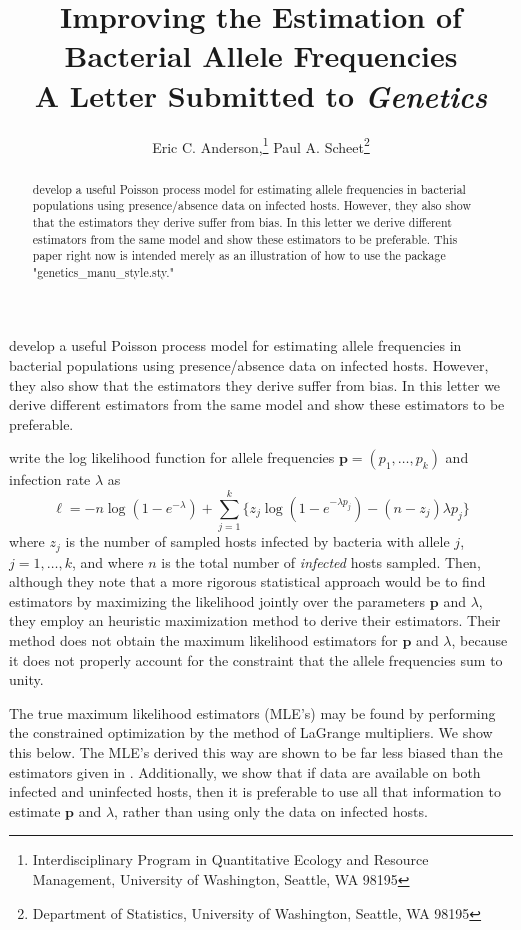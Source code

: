 \documentclass[12pt,titlepage]{article}
\title{Improving the Estimation of Bacterial Allele Frequencies  \\
\protect\small A Letter Submitted to {\em Genetics}}
\author{Eric C. Anderson,\thanks{Interdisciplinary Program in Quantitative
Ecology and Resource Management, University of Washington,
Seattle, WA 98195} Paul A. Scheet\thanks{Department of Statistics, University of
Washington, Seattle, WA 98195}}
\newcommand{\bp}{\mathbf{p}}
\begin{document}
\maketitle



\begin{abstract}
 develop a useful Poisson process
model for estimating allele frequencies in bacterial populations using
presence/absence data on infected hosts.  However, they also show that the
estimators they derive suffer from bias.  In this letter we derive
different estimators from the same model and show these estimators to
be preferable.  This paper right now is intended merely as an illustration
of how to use the package "genetics\_manu\_style.sty."
\end{abstract}


 develop a useful Poisson process
model for estimating allele frequencies in bacterial populations using
presence/absence data on infected hosts.  However, they also show that the
estimators they derive suffer from bias.  In this letter we derive
different estimators from the same model and show these estimators to
be preferable.

   write the log likelihood function for allele
frequencies 
$\bp=(p_1,\ldots,p_k)$ and infection rate
$\lambda$ as 
\begin{equation}
\ell = -n \log(1-e^{-\lambda}) + \sum_{j=1}^k
\{z_j \log(1-e^{-\lambda p_j}) - (n-z_j)\lambda p_j\}
\label{eq:loglike}
\end{equation}
where $z_j$ is the number of sampled hosts infected by
bacteria with allele $j$, $j=1,\ldots,k$, and where $n$ is the total
number of {\em infected} hosts sampled.  Then, although they note that a
more rigorous statistical approach would be to find estimators by
maximizing the likelihood jointly over the parameters $\bp$ and
$\lambda$, they employ an heuristic maximization method to derive their
estimators.  Their method does not obtain the maximum likelihood
estimators for $\bp$ and $\lambda$, because it does not properly account
for the constraint that the allele frequencies sum to unity. 


The true maximum likelihood estimators (MLE's) may be found by performing
the constrained optimization by the method of LaGrange multipliers.  We
show this below.  The MLE's derived this way are shown to be
far less biased than the estimators given in . Additionally, we
show that if data are available on both infected and uninfected hosts, then it is
preferable to use all that information to estimate $\bp$ and
$\lambda$, rather than using only the data on infected hosts. 
\end{document}
